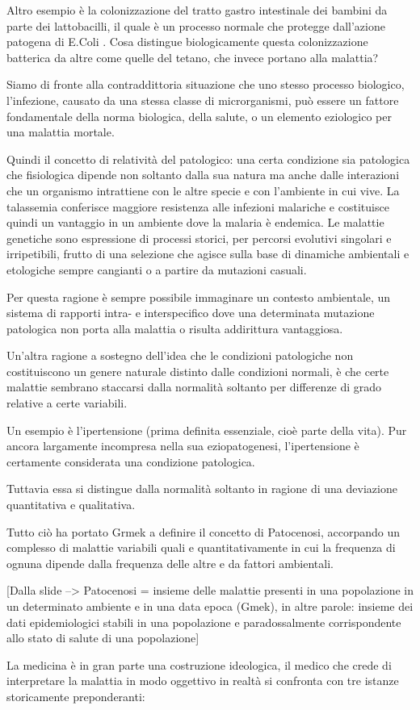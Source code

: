\documentclass[]{article}
\begin{document}
\begin{itemize}
  Altro esempio è la colonizzazione del tratto gastro intestinale dei
  bambini da parte dei lattobacilli, il quale è un processo normale che
  protegge dall'azione patogena di E.Coli . Cosa distingue
  biologicamente questa colonizzazione batterica da altre come quelle
  del tetano, che invece portano alla malattia?

  Siamo di fronte alla contraddittoria situazione che uno stesso
  processo biologico, l'infezione, causato da una stessa classe di
  microrganismi, può essere un fattore fondamentale della norma
  biologica, della salute, o un elemento eziologico per una malattia
  mortale.

  Quindi il concetto di relatività del patologico: una certa condizione
  sia patologica che fisiologica dipende non soltanto dalla sua natura
  ma anche dalle interazioni che un organismo intrattiene con le altre
  specie e con l'ambiente in cui vive. La talassemia conferisce maggiore
  resistenza alle infezioni malariche e costituisce quindi un vantaggio
  in un ambiente dove la malaria è endemica. Le malattie genetiche sono
  espressione di processi storici, per percorsi evolutivi singolari e
  irripetibili, frutto di una selezione che agisce sulla base di
  dinamiche ambientali e etologiche sempre cangianti o a partire da
  mutazioni casuali.

  Per questa ragione è sempre possibile immaginare un contesto
  ambientale, un sistema di rapporti intra- e interspecifico dove una
  determinata mutazione patologica non porta alla malattia o risulta
  addirittura vantaggiosa.

  Un'altra ragione a sostegno dell'idea che le condizioni patologiche
  non costituiscono un genere naturale distinto dalle condizioni
  normali, è che certe malattie sembrano staccarsi dalla normalità
  soltanto per differenze di grado relative a certe variabili.

  Un esempio è l'ipertensione (prima definita essenziale, cioè parte
  della vita). Pur ancora largamente incompresa nella sua
  eziopatogenesi, l'ipertensione è certamente considerata una condizione
  patologica.

  Tuttavia essa si distingue dalla normalità soltanto in ragione di una
  deviazione quantitativa e qualitativa.

  Tutto ciò ha portato Grmek a definire il concetto di Patocenosi,
  accorpando un complesso di malattie variabili quali e
  quantitativamente in cui la frequenza di ognuna dipende dalla
  frequenza delle altre e da fattori ambientali.

  {[}Dalla slide --\textgreater{} Patocenosi = insieme delle malattie
  presenti in una popolazione in un determinato ambiente e in una data
  epoca (Gmek), in altre parole: insieme dei dati epidemiologici stabili
  in una popolazione e paradossalmente corrispondente allo stato di
  salute di una popolazione{]}

  La medicina è in gran parte una costruzione ideologica, il medico che
  crede di interpretare la malattia in modo oggettivo in realtà si
  confronta con tre istanze storicamente preponderanti:
\end{itemize}
\end{document}
